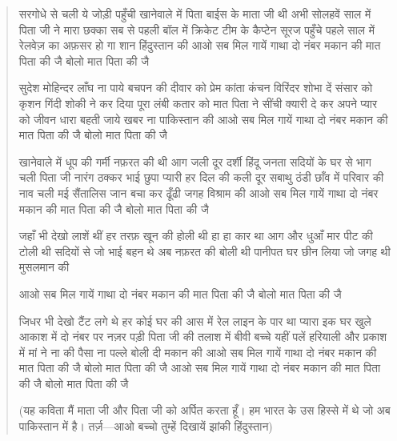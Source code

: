 {{{\begin{verse}
{{{{{{{{{{{{{{{{सरगोधे से चली ये जोड़ी
पहुँची खानेवाले में
पिता बाईस के माता जी थी
अभी सोलहवें साल में
पिता जी ने मारा छक्का
सब से पहली बॉल में
क्रिकेट टीम के कैप्टेन सूरज
पहुँचे पहले साल में
रेलवेज़ का अफ़सर हो गा
शान हिंदुस्तान की
आओ सब मिल गायें गाथा
दो नंबर मकान की
मात पिता की जै बोलो
मात पिता की जै

सुदेश मोहिन्दर लाँघ ना पाये
बचपन की दीवार को
प्रेम कांता कंचन विरिंदर
शोभा दें संसार को
कृशन गिंदी शोकी ने कर दिया
पूरा लंबी कतार को
मात पिता ने सींची क्यारी
दे कर अपने प्यार को
जीवन धारा बहती जाये
खबर ना पाकिस्तान की
आओ सब मिल गायें गाथा
दो नंबर मकान की
मात पिता की जै बोलो
मात पिता की जै

खानेवाले में धूप की गर्मी
नफ़रत की थी आग जली
दूर दर्शी हिंदू जनता
सदियों के घर से भाग चली
पिता जी नारंग ठक्कर भाई
छुपा प्यारी हर दिल की कली
दूर सबाथु ठंडी छाँव में
परिवार की नाव चली
मई सैंतालिस जान बचा कर
ढूँढी जगह विश्राम की
आओ सब मिल गायें गाथा
दो नंबर मकान की
मात पिता की जै बोलो
मात पिता की जै

जहाँ भी देखो लाशें थीं
हर तरफ़ खून की होली थी
हा हा कार था आग और धुआँ
मार पीट की टोली थी
सदियों से जो भाई बहन थे
अब नफ़रत की बोली थी
पानीपत घर छीन लिया
जो जगह थी मुसलमान की



आओ सब मिल गायें गाथा
दो नंबर मकान की
मात पिता की जै बोलो
मात पिता की जै

जिधर भी देखो टैंट लगे थे
हर कोई घर की आस में
रेल लाइन के पार था प्यारा
इक घर खुले आकाश में
दो नंबर पर नज़र पड़ी
पिता जी की तलाश में
बीवी बच्चे यहीं पलें
हरियाली और प्रकाश में
मां ने ना की पैसा ना पल्ले
बोली दी मकान की
आओ सब मिल गायें गाथा
दो नंबर मकान की
मात पिता की जै बोलो
मात पिता की जै
आओ सब मिल गायें गाथा
दो नंबर मकान की
मात पिता की जै बोलो
मात पिता की जै





(यह कविता मैं माता जी और पिता जी को
अर्पित करता हूँ। हम भारत के उस हिस्से में थे
जो अब पाकिस्तान में है।
तर्ज़—आओ बच्चो तुम्हें दिखायें झांकी हिंदुस्तान) 

}}}}}}}}}}}}}}}}
\end{verse}}}}
